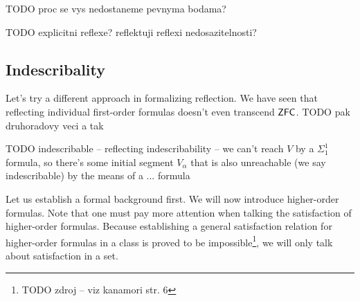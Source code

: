 TODO proc se vys nedostaneme pevnyma bodama?

TODO explicitni reflexe? reflektuji reflexi nedosazitelnosti?






\subsection{Indescribality} %



Let's try a different approach in formalizing reflection. We have seen that reflecting individual first-order formulas doesn't even transcend $\sf{ZFC}$. 
TODO pak druhoradovy veci a tak

TODO indescribable -- reflecting indescribability -- we can't reach $V$ by a $\Sigma_1^1$ formula, so there's some initial segment $V_\alpha$ that is also unreachable (we say indescribable) by the means of a ... formula



Let us establish a formal background first. We will now introduce higher-order formulas. Note that one must pay more attention when talking the satisfaction of higher-order formulas. Because establishing a general satisfaction relation for higher-order formulas in a class is proved to be impossible\footnote{TODO zdroj -- viz kanamori str. 6}, we will only talk about satisfaction in a set.


